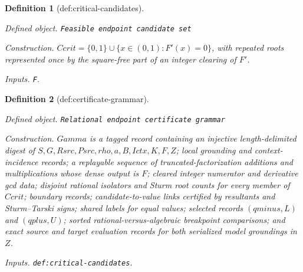 \documentclass{article}
\newtheorem{definition}{Definition}
\begin{document}
\begin{definition}[def:critical-candidates]\label{def:critical-candidates}
\par\smallskip\noindent\emph{Defined object.} \texttt{Feasible endpoint candidate set}
\par\smallskip\noindent\emph{Construction.} \(Ccrit=\{0,1\}\cup\{x\in(0,1):F'(x)=0\}\), with repeated roots represented once by the square-free part of an integer clearing of \(F'\).
\par\smallskip\noindent\emph{Inputs.} \texttt{F}.
\end{definition}

\begin{definition}[def:certificate-grammar]\label{def:certificate-grammar}
\par\smallskip\noindent\emph{Defined object.} \texttt{Relational endpoint certificate grammar}
\par\smallskip\noindent\emph{Construction.} \(Gamma\) is a tagged record containing an injective length-delimited digest of \(S,G,Rsrc,Psrc,rho,a,B,Ictx,K,F,Z\); local grounding and context-incidence records; a replayable sequence of truncated-factorization additions and multiplications whose dense output is \(F\); cleared integer numerator and derivative gcd data; disjoint rational isolators and Sturm root counts for every member of \(Ccrit\); boundary records; candidate-to-value links certified by resultants and Sturm--Tarski signs; shared labels for equal values; selected records \((qminus,L)\) and \((qplus,U)\); sorted rational-versus-algebraic breakpoint comparisons; and exact source and target evaluation records for both serialized model groundings in \(Z\).
\par\smallskip\noindent\emph{Inputs.} \texttt{def:\allowbreak{}critical-\allowbreak{}candidates}.
\end{definition}
\end{document}
